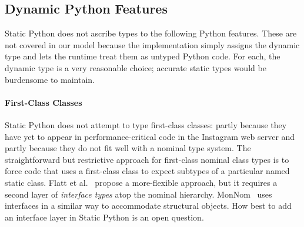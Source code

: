 \documentclass[english,cleveref,submission]{programming}
\newcommand{\SP}{Static Python}
\begin{document}
\subsection{Dynamic Python Features}
\label{s:dynamic-python}


\SP{} does not ascribe types to the following Python features.
These are not covered in our model because the implementation simply
assigns the dynamic type and lets the runtime treat them as untyped
Python code.
For each, the dynamic type is a very reasonable choice;
accurate static types would be burdensome to maintain.


\paragraph{First-Class Classes}

\SP{} does not attempt to type first-class classes: partly because they have
yet to appear in performance-critical code in the Instagram web server
and partly because they do not fit well with a nominal type system.
The straightforward but restrictive approach for first-class nominal class types
is to force code that uses a first-class class to expect subtypes of a
particular named static class.
Flatt et al.~\cite{fkf-popl-1998} propose a more-flexible approach, %
but it requires a second layer of \emph{interface types} atop the nominal hierarchy.
MonNom~\cite{mt-oopsla-2021} uses interfaces in a similar way to accommodate
structural objects.
How best to add an interface layer in \SP{} is an open question.


\end{document}
